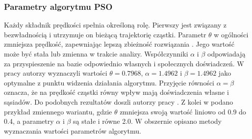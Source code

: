 \subsubsection{Parametry algorytmu PSO}
Każdy składnik prędkości spełnia określoną rolę. Pierwszy jest związany z bezwładnością i utrzymuje on bieżącą trajektorię cząstki. Parametr $\theta$ w ogólności zmniejsza prędkość, zapewniając lepszą zbieżność rozwiązania \parencite{Blackwell2019}. Jego wartość może być stała lub zmienna w trakcie analizy. Współczynniki $\alpha$ i $\beta$ odpowiadają za przyspieszenie na bazie odpowiednio własnych i społecznych doświadczeń. 
W pracy \cite{Clerc2002} autorzy wyznaczyli wartości $\theta=0.7968$, $\alpha=1.4962$ i $\beta=1.4962$ jako optymalne z punktu widzenia działania algorytmu. Przyjęcie równości $\alpha=\beta$ oznacza, że na prędkość cząstki równy wpływ mają doświadczenia własne i sąsiadów. Do podobnych rezultatów doszli autorzy pracy \cite{Shi1998}. Z kolei w \cite{Xu2007} podano przykład zmiennego wariantu, gdzie $\theta$ zmniejsza swoją wartość liniowo od 0.9 do 0.4, a parametry $\alpha$ i $\beta$ są stałe i równe 2.0. W \cite{Poli2007} obszernie opisano metody wyznaczania wartości parametrów algorytmu.
